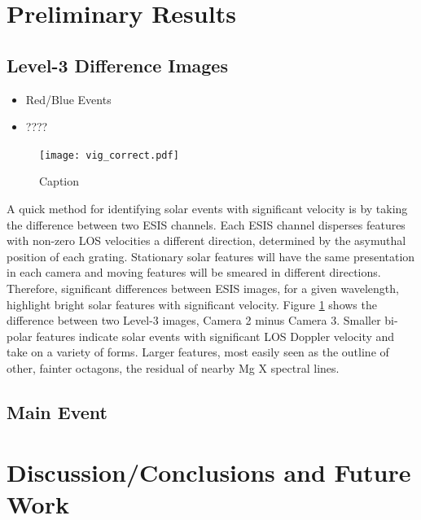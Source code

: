         
        
      


\section{Preliminary Results}
    \subsection{Level-3 Difference Images}
        \begin{itemize}
            \item Red/Blue Events
            \item ????
        \end{itemize}
        
        \begin{figure}
            \centering
            \texttt{[image: vig\_correct.pdf]}
            \caption{Caption}
            \label{fig:l3_dif}
        \end{figure}
        
    	A quick method for identifying solar events with significant velocity is by taking the difference between two ESIS channels.
    	Each ESIS channel disperses features with non-zero LOS velocities a different direction, determined by the asymuthal position of each grating. 
    	Stationary solar features will have the same presentation in each camera and moving features will be smeared in different directions.
    	Therefore, significant differences between ESIS images, for a given wavelength, highlight bright solar features with significant velocity.
    	Figure \ref{fig:l3_dif} shows the difference between two Level-3 images, Camera 2 minus Camera 3.
    	Smaller bi-polar features indicate solar events with significant LOS Doppler velocity and take on a variety of forms.
    	Larger features, most easily seen as the outline of other, fainter octagons, the residual of nearby Mg X spectral lines.
    
    \subsection{Main Event}

\section{Discussion/Conclusions and Future Work}



